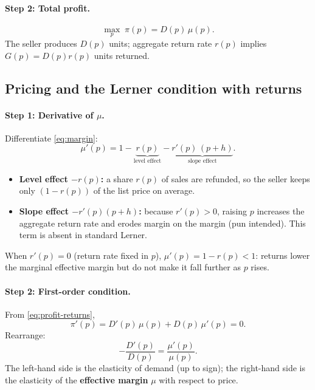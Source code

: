 \documentclass[11pt]{article}
\begin{document}
\paragraph{Step 2: Total profit.}
\begin{equation}
  \max_p \;\pi(p) = D(p)\,\mu(p).
  \label{eq:profit-returns}
\end{equation}
The seller produces $D(p)$ units; aggregate return rate $r(p)$ implies
$G(p)=D(p)r(p)$ units returned.

\subsection{Pricing and the Lerner condition with returns}

\paragraph{Step 1: Derivative of $\mu$.}
Differentiate \eqref{eq:margin}:
\begin{equation}
  \mu'(p) = 1 - \underbrace{r(p)}_{\text{level effect}}
  - \underbrace{r'(p)\,(p+h)}_{\text{slope effect}}.
  \label{eq:mu-prime}
\end{equation}
\begin{itemize}
  \item \textbf{Level effect $-r(p)$:} a share $r(p)$ of sales are refunded, so
    the seller keeps only $(1-r(p))$ of the list price on average.
  \item \textbf{Slope effect $-r'(p)(p+h)$:} because $r'(p)>0$, raising $p$
    increases the aggregate return rate and erodes margin on the margin
    (pun intended).  This term is absent in standard Lerner.
\end{itemize}
When $r'(p)=0$ (return rate fixed in $p$), $\mu'(p)=1-r(p)<1$: returns lower
the marginal effective margin but do not make it fall further as $p$ rises.

\paragraph{Step 2: First-order condition.}
From \eqref{eq:profit-returns},
\begin{equation}
  \pi'(p) = D'(p)\,\mu(p) + D(p)\,\mu'(p) = 0.
  \label{eq:foc-returns}
\end{equation}
Rearrange:
\begin{equation}
  -\frac{D'(p)}{D(p)} = \frac{\mu'(p)}{\mu(p)}.
  \label{eq:foc-ratio}
\end{equation}
The left-hand side is the elasticity of demand (up to sign); the right-hand
side is the elasticity of the \textbf{effective margin} $\mu$ with respect
to price.
\end{document}
